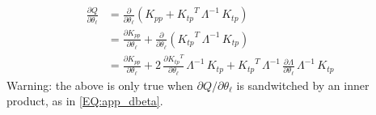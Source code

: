 \documentclass[11pt,a4paper]{article}
\numberwithin{equation}{section}
\begin{document}
\begin{align}
\frac{\partial Q}{\partial \theta_\ell}
  &= \frac{\partial}{\partial \theta_\ell} \left(K_{pp} + {K_{tp}}^T\,\Lambda^{-1}\,K_{tp}\right) \\
  &= \frac{\partial K_{pp}}{\partial \theta_\ell} + \frac{\partial}{\partial \theta_\ell}\left({K_{tp}}^T\,\Lambda^{-1}\,K_{tp}\right) \\
  &= \frac{\partial K_{pp}}{\partial \theta_\ell} + 2\,\frac{\partial {K_{tp}}^T}{\partial \theta_\ell}\,\Lambda^{-1}\,K_{tp} + {K_{tp}}^T\,\Lambda^{-1}\,\frac{\partial \Lambda}{\partial \theta_\ell}\,\Lambda^{-1}\,K_{tp}
\end{align}
Warning: the above is only true when $\partial Q/\partial \theta_\ell$ is sandwitched by an inner product, as in \ref{EQ:app_dbeta}.
\end{document}
